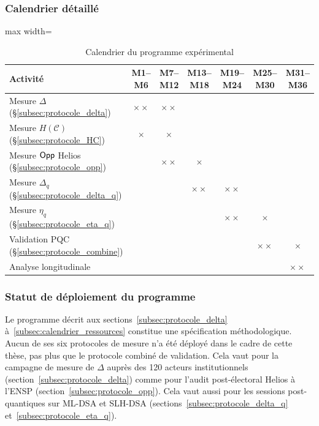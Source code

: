 \begin{sloppypar}
\subsubsection{Calendrier d\'etaill\'e}
\label{subsubsec:calendrier_detaille}

\begin{table}[htbp]
\centering
\caption{Calendrier du programme exp\'erimental}
\label{tab:calendrier_experimental}
\small 
\setlength{\tabcolsep}{4pt} 
\begin{adjustbox}{max width=\linewidth} 
\begin{tabular}{@{}lcccccc@{}}
\toprule
\textbf{Activit\'e} & \textbf{M1--M6} & \textbf{M7--M12} & \textbf{M13--M18} &
\textbf{M19--M24} & \textbf{M25--M30} & \textbf{M31--M36} \\
\midrule
Mesure $\Delta$ (\S\ref{subsec:protocole_delta}) & $\times\times$ & $\times\times$ & & & & \\
Mesure $H(\mathcal{C})$ (\S\ref{subsec:protocole_HC}) & $\times$ & $\times$ & & & & \\
Mesure $\mathsf{Opp}$ Helios (\S\ref{subsec:protocole_opp}) & & $\times\times$ & $\times$ & & & \\
Mesure $\Delta_q$ (\S\ref{subsec:protocole_delta_q}) & & & $\times\times$ & $\times\times$ & & \\
Mesure $\eta_q$ (\S\ref{subsec:protocole_eta_q}) & & & & $\times\times$ & $\times$ & \\
Validation PQC (\S\ref{subsec:protocole_combine}) & & & & & $\times\times$ & $\times$ \\
Analyse longitudinale & & & & & & $\times\times$ \\
\bottomrule
\end{tabular}
\end{adjustbox}
\end{table}
\subsubsection{Statut de d\'eploiement du programme}
\label{subsubsec:statut_deploiement}

Le programme d\'ecrit aux sections~\ref{subsec:protocole_delta}
\`a~\ref{subsec:calendrier_ressources} constitue une sp\'ecification
m\'ethodologique. Aucun de ses six protocoles de mesure n'a \'et\'e d\'eploy\'e
dans le cadre de cette th\`ese, pas plus que le protocole combin\'e de validation. Cela vaut pour la
campagne de mesure de $\Delta$ aupr\`es des 120 acteurs institutionnels
(section~\ref{subsec:protocole_delta}) comme pour l'audit post-\'electoral
Helios \`a l'ENSP (section~\ref{subsec:protocole_opp}). Cela vaut aussi pour les sessions
post-quantiques sur ML-DSA et SLH-DSA
(sections~\ref{subsec:protocole_delta_q}
et~\ref{subsec:protocole_eta_q}).


\end{sloppypar}
